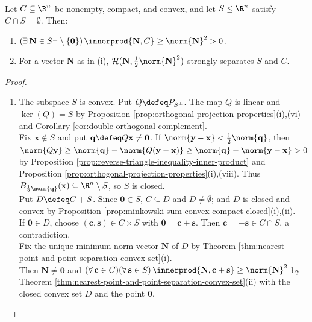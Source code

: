 \begin{theorem} \label{thm:compact-convex-set-separated-from-subspace} \\
Let $C\subseteq\R^n$ be nonempty, compact, and convex, and let $S\leq\R^n$ satisfy $C\cap S=\emptyset$. Then:
\begin{enumerate}[label=(\roman*)]
\setlength{\itemsep}{0pt}
\item $(\exists\,\mathbf{N}\in S^\perp\setminus\{\mathbf{0}\})\,\innerprod{\mathbf{N},C}\geq\norm{\mathbf{N}}^2>0$.
\item For a vector $\mathbf{N}$ as in (i), $\mathcal{H}(\mathbf{N},\frac{1}{2}\norm{\mathbf{N}}^2)$ strongly separates $S$ and $C$.
\end{enumerate}
\begin{proof}
\begin{enumerate}[label=(\roman*)]
\setlength{\itemsep}{0pt}
\item The subspace $S$ is convex. Put $Q\defeq P_{S^\perp}$. The map $Q$ is linear and $\ker(Q)=S$ by Proposition \ref{prop:orthogonal-projection-properties}(i),(vi) and Corollary \ref{cor:double-orthogonal-complement}.\\
Fix $\mathbf{x}\notin S$ and put $\mathbf{q}\defeq Q\mathbf{x}\neq\mathbf{0}$. If $\norm{\mathbf{y}-\mathbf{x}}<\frac{1}{2}\norm{\mathbf{q}}$, then $\norm{Q\mathbf{y}}\geq\norm{\mathbf{q}}-\norm{Q(\mathbf{y}-\mathbf{x})}\geq\norm{\mathbf{q}}-\norm{\mathbf{y}-\mathbf{x}}>0$ by Proposition \ref{prop:reverse-triangle-inequality-inner-product} and Proposition \ref{prop:orthogonal-projection-properties}(i),(viii). Thus $B_{\frac{1}{2}\norm{\mathbf{q}}}(\mathbf{x})\subseteq\R^n\setminus S$, so $S$ is closed.\\
Put $D\defeq C+S$. Since $\mathbf{0}\in S$, $C\subseteq D$ and $D\neq\emptyset$; and $D$ is closed and convex by Proposition \ref{prop:minkowski-sum-convex-compact-closed}(i),(ii).\\
If $\mathbf{0}\in D$, choose $(\mathbf{c},\mathbf{s})\in C\times S$ with $\mathbf{0}=\mathbf{c}+\mathbf{s}$. Then $\mathbf{c}=-\mathbf{s}\in C\cap S$, a contradiction.\\
Fix the unique minimum-norm vector $\mathbf{N}$ of $D$ by Theorem \ref{thm:nearest-point-and-point-separation-convex-set}(i).\\
Then $\mathbf{N}\neq\mathbf{0}$ and $(\forall\,\mathbf{c}\in C)(\forall\,\mathbf{s}\in S)\,\innerprod{\mathbf{N},\mathbf{c}+\mathbf{s}}\geq\norm{\mathbf{N}}^2$ by Theorem \ref{thm:nearest-point-and-point-separation-convex-set}(ii) with the closed convex set $D$ and the point $\mathbf{0}$.\\

\end{enumerate}
\end{proof}
\end{theorem}
